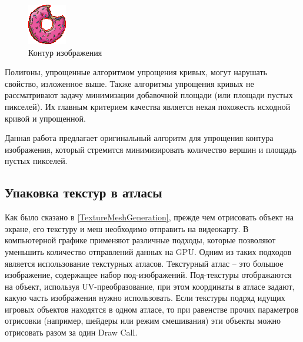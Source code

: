 \documentclass{fefu_thesis/cls/fefu}
\begin{document}
    \begin{figure}[H]
        \centering
        \includegraphics[scale=1.2]{images/donutpixel_contour_none.png}
        \caption{Контур изображения}
    \end{figure}

    Полигоны, упрощенные алгоритмом упрощения кривых, могут нарушать свойство, изложенное выше. Также алгоритмы упрощения кривых не рассматривают задачу минимизации добавочной площади (или площади пустых пикселей). Их главным критерием качества является некая похожесть исходной кривой и упрощенной.

    Данная работа предлагает оригинальный алгоритм для упрощения контура изображения, который стремится минимизировать количество вершин и площадь пустых пикселей.

    \subsection{Упаковка текстур в атласы}

    Как было сказано в \ref{TextureMeshGeneration}, прежде чем отрисовать объект на экране, его текстуру и меш необходимо отправить на видеокарту. В компьютерной графике применяют различные подходы, которые позволяют уменьшить количество отправлений данных на GPU. Одним из таких подходов является использование текстурных атласов. Текстурный атлас -- это большое изображение, содержащее набор под-изображений. Под-текстуры отображаются на объект, используя UV-преобразование, при этом координаты в атласе задают, какую часть изображения нужно использовать. Если текстуры подряд идущих игровых объектов находятся в одном атласе, то при равенстве прочих параметров отрисовки (например, шейдеры или режим смешивания) эти объекты можно отрисовать разом за один Draw Call.
\end{document}
